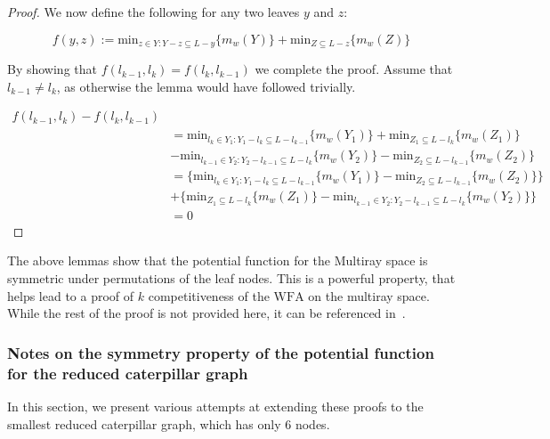 \begin{proof}
    We now define the following for any two leaves $y$ and $z$: 

    \begin{equation*}
        f(y, z) := \mathrm{min}_{z \in Y : Y - z \subseteq L-y} \{ m_w(Y)\} + \mathrm{min}_{Z \subseteq L-z} \{ m_w(Z)\}
    \end{equation*}

    By showing that $f(l_{k-1}, l_k) = f(l_k, l_{k-1})$ we complete the proof.
    Assume that $l_{k-1} \neq l_k$, as otherwise the lemma would have followed trivially. 

    \begin{equation*}
        \begin{split}
        f(l_{k-1}, l_k) - f(l_k, l_{k-1})\\
        &= \mathrm{min}_{l_k \in Y_1 : Y_1 - l_k \subseteq L - l_{k-1}} \{ m_w(Y_1)\} + \mathrm{min}_{Z_1 \subseteq L - l_k} \{ m_w(Z_1)\} \\
        &- \mathrm{min}_{l_{k-1} \in Y_2 : Y_2 - l_{k-1} \subseteq L - l_k} \{ m_w(Y_2)\} - \mathrm{min}_{Z_2 \subseteq L - l_{k-1}} \{ m_w(Z_2)\} \\
        &= \{ \mathrm{min}_{l_k \in Y_1 : Y_1 - l_k \subseteq L - l_{k-1}} \{ m_w(Y_1)\} - \mathrm{min}_{Z_2 \subseteq L - l_{k-1}} \{ m_w(Z_2)\}\}\\
        &+ \{\mathrm{min}_{Z_1 \subseteq L - l_k} \{ m_w(Z_1)\} - \mathrm{min}_{l_{k-1} \in Y_2 : Y_2 - l_{k-1} \subseteq L - l_k} \{ m_w(Y_2)\}\} \\ 
        &= 0
        \end{split}
    \end{equation*}
\end{proof}

The above lemmas show that the potential function for the Multiray space is symmetric under permutations of the leaf nodes. This is a powerful property, that helps lead to a proof of $k$ competitiveness of the $\mathrm{WFA}$ on the multiray space. While the rest of the proof is not provided here, it can be referenced in~\cite{unifyingPotential2021}.

\subsubsection*{Notes on the symmetry property of the potential function for the reduced caterpillar graph}

In this section, we present various attempts at extending these proofs to the smallest reduced caterpillar graph, which has only 6 nodes.

